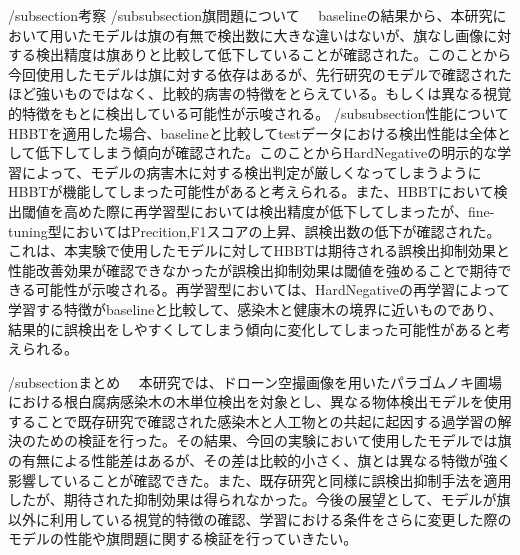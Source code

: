 /subsection{考察}
/subsubsection{旗問題について}
　baselineの結果から、本研究において用いたモデルは旗の有無で検出数に大きな違いはないが、旗なし画像に対する検出精度は旗ありと比較して低下していることが確認された。このことから今回使用したモデルは旗に対する依存はあるが、先行研究のモデルで確認されたほど強いものではなく、比較的病害の特徴をとらえている。もしくは異なる視覚的特徴をもとに検出している可能性が示唆される。
/subsubsection{性能について}
　HBBTを適用した場合、baselineと比較してtestデータにおける検出性能は全体として低下してしまう傾向が確認された。このことからHardNegativeの明示的な学習によって、モデルの病害木に対する検出判定が厳しくなってしまうようにHBBTが機能してしまった可能性があると考えられる。また、HBBTにおいて検出閾値を高めた際に再学習型においては検出精度が低下してしまったが、fine-tuning型においてはPrecition,F1スコアの上昇、誤検出数の低下が確認された。これは、本実験で使用したモデルに対してHBBTは期待される誤検出抑制効果と性能改善効果が確認できなかったが誤検出抑制効果は閾値を強めることで期待できる可能性が示唆される。再学習型においては、HardNegativeの再学習によって学習する特徴がbaselineと比較して、感染木と健康木の境界に近いものであり、結果的に誤検出をしやすくしてしまう傾向に変化してしまった可能性があると考えられる。
 
/subsection{まとめ}
　本研究では、ドローン空撮画像を用いたパラゴムノキ圃場における根白腐病感染木の木単位検出を対象とし、異なる物体検出モデルを使用することで既存研究で確認された感染木と人工物との共起に起因する過学習の解決のための検証を行った。その結果、今回の実験において使用したモデルでは旗の有無による性能差はあるが、その差は比較的小さく、旗とは異なる特徴が強く影響していることが確認できた。また、既存研究と同様に誤検出抑制手法を適用したが、期待された抑制効果は得られなかった。今後の展望として、モデルが旗以外に利用している視覚的特徴の確認、学習における条件をさらに変更した際のモデルの性能や旗問題に関する検証を行っていきたい。
